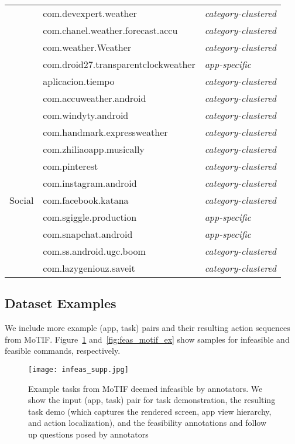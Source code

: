 \begin{table}
\begin{tabular}{|l|l|l|}
          & com.devexpert.weather& \textit{category-clustered} \\ \cline{2-3}
          & com.chanel.weather.forecast.accu & \textit{category-clustered}\\ \cline{2-3}
         & com.weather.Weather& \textit{category-clustered}\\ \cline{2-3}
          & com.droid27.transparentclockweather& \textit{app-specific}\\ \cline{2-3}
         & aplicacion.tiempo & \textit{category-clustered}\\ \cline{2-3}
         & com.accuweather.android & \textit{category-clustered}\\ \cline{2-3}
         & com.windyty.android & \textit{category-clustered}\\ \cline{2-3}
         & com.handmark.expressweather & \textit{category-clustered}\\
       \hline
       \multirow{7}{*}{Social}&  com.zhiliaoapp.musically & \textit{category-clustered} \\ \cline{2-3}
          & com.pinterest & \textit{category-clustered} \\ \cline{2-3}
           & com.instagram.android & \textit{category-clustered}\\ \cline{2-3}
          & com.facebook.katana & \textit{category-clustered} \\ \cline{2-3}
           & com.sgiggle.production & \textit{app-specific}\\ \cline{2-3}
           & com.snapchat.android & \textit{app-specific}\\ \cline{2-3}
           & com.ss.android.ugc.boom & \textit{category-clustered} \\ \cline{2-3}
           & com.lazygeniouz.saveit & \textit{category-clustered}\\ \hline
    \end{tabular}
    \label{tab:apps3}
\end{table}

\subsection{Dataset Examples}
We include more example (app, task) pairs and their resulting action sequences from MoTIF. Figure~\ref{fig:infeas_motif_ex} and~\ref{fig:feas_motif_ex} show samples for infeasible and feasible commands, respectively.

\begin{figure}[t]
    \centering
    \texttt{[image: infeas\_supp.jpg]}
            \caption{Example tasks from MoTIF deemed infeasible by annotators. We show the input (app, task) pair for task demonstration, the resulting task demo (which captures the rendered screen, app view hierarchy, and action localization), and the feasibility annotations and follow up questions posed by annotators}
                \label{fig:infeas_motif_ex}
\end{figure}

